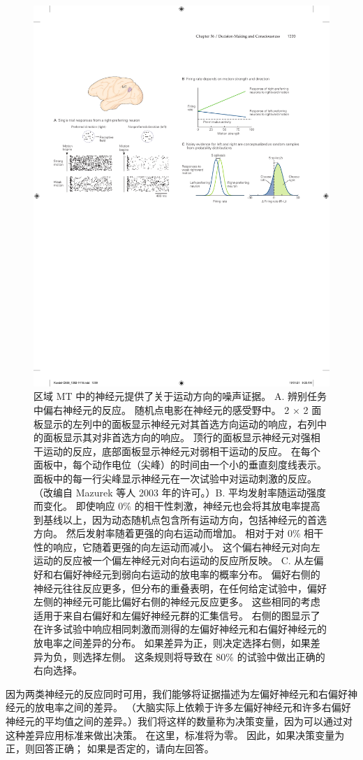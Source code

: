 \begin{figure}[htbp]
	\centering
	\includegraphics[width=0.6\linewidth]{chap56/fig_56_4}
	\caption{区域 MT 中的神经元提供了关于运动方向的噪声证据。 A. 辨别任务中偏右神经元的反应。 随机点电影在神经元的感受野中。 2 × 2 面板显示的左列中的面板显示神经元对其首选方向运动的响应，右列中的面板显示其对非首选方向的响应。 顶行的面板显示神经元对强相干运动的反应，底部面板显示神经元对弱相干运动的反应。 在每个面板中，每个动作电位（尖峰）的时间由一个小的垂直刻度线表示。 面板中的每一行尖峰显示神经元在一次试验中对运动刺激的反应。 （改编自 Mazurek 等人 2003 年的许可。）B. 平均发射率随运动强度而变化。 即使响应 0\% 的相干性刺激，神经元也会将其放电率提高到基线以上，因为动态随机点包含所有运动方向，包括神经元的首选方向。 然后发射率随着更强的向右运动而增加。 相对于对 0\% 相干性的响应，它随着更强的向左运动而减小。 这个偏右神经元对向左运动的反应被一个偏左神经元对向右运动的反应所反映。 C. 从左偏好和右偏好神经元到弱向右运动的放电率的概率分布。 偏好右侧的神经元往往反应更多，但分布的重叠表明，在任何给定试验中，偏好左侧的神经元可能比偏好右侧的神经元反应更多。 这些相同的考虑适用于来自右偏好和左偏好神经元群的汇集信号。 右侧的图显示了在许多试验中响应相同刺激而测得的左偏好神经元和右偏好神经元的放电率之间差异的分布。 如果差异为正，则决定选择右侧，如果差异为负，则选择左侧。 这条规则将导致在 80\% 的试验中做出正确的右向选择。}
	\label{fig:56_4}
\end{figure}

因为两类神经元的反应同时可用，我们能够将证据描述为左偏好神经元和右偏好神经元的放电率之间的差异。 （大脑实际上依赖于许多左偏好神经元和许多右偏好神经元的平均值之间的差异。）我们将这样的数量称为决策变量，因为可以通过对这种差异应用标准来做出决策。 在这里，标准将为零。 因此，如果决策变量为正，则回答正确； 如果是否定的，请向左回答。

